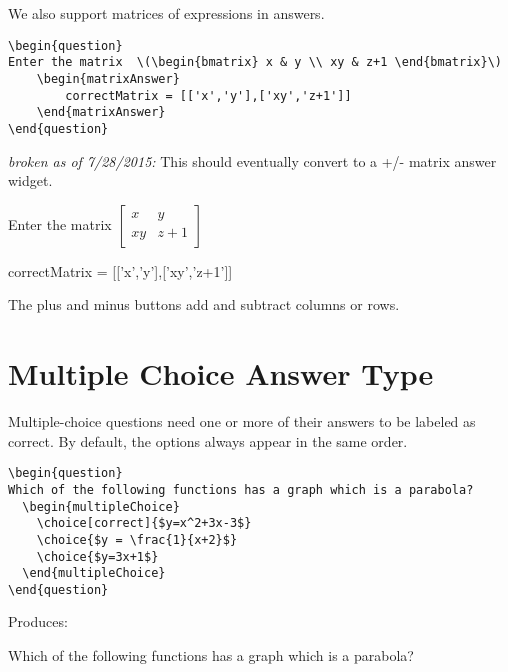 \documentclass{ximera}
\begin{document}
\begin{example} We also support matrices of expressions in answers.

\begin{verbatim}
\begin{question}
Enter the matrix  \(\begin{bmatrix} x & y \\ xy & z+1 \end{bmatrix}\)
    \begin{matrixAnswer}
	    correctMatrix = [['x','y'],['xy','z+1']]
    \end{matrixAnswer}
\end{question}
\end{verbatim}

\emph{broken as of 7/28/2015:} This should eventually convert to a +/- matrix answer widget.

\begin{question}
Enter the matrix  \(\begin{bmatrix} x & y \\ xy & z+1 \end{bmatrix}\)
\begin{matrixAnswer}
    correctMatrix = [['x','y'],['xy','z+1']]
\end{matrixAnswer}
\end{question}

\begin{remark}
  The plus and minus buttons add and subtract columns or rows.  
\end{remark}
\end{example}

\section{Multiple Choice Answer Type} \label{MCAnswerType}

\begin{example}
Multiple-choice questions need one or more of their answers to be labeled as correct. By default, the options always appear in the same order.

\begin{verbatim}
\begin{question}
Which of the following functions has a graph which is a parabola?
  \begin{multipleChoice}
    \choice[correct]{$y=x^2+3x-3$}
    \choice{$y = \frac{1}{x+2}$}
    \choice{$y=3x+1$}
  \end{multipleChoice}
\end{question}
\end{verbatim}

Produces:

\begin{question}
  Which of the following functions has a graph which is a parabola?
  \begin{multipleChoice}
  \end{multipleChoice}
\end{question}
\end{example}
\end{document}

